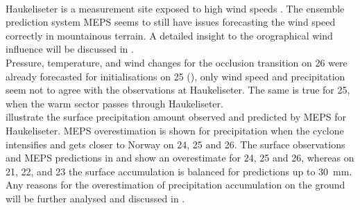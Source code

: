 \\
Haukeliseter is a measurement site exposed to high wind speeds \citep{wolff_measurements_2013,wolff_derivation_2015}. The ensemble prediction system MEPS seems to still have issues forecasting the wind speed correctly in mountainous terrain.
A detailed insight to the orographical wind influence will be discussed in . 
\\
Pressure, temperature, and wind changes for the occlusion transition on \SI{26}{\dec} were already forecasted for initialisations on \SI{25}{\dec} (), only wind speed and precipitation seem not to agree with the observations at Haukeliseter. The same is true for \SI{25}{\dec}, when the warm sector passes through Haukeliseter. 
\\
 illustrate the surface precipitation amount observed and predicted by MEPS for Haukeliseter. MEPS overestimation is shown for precipitation when the cyclone intensifies and gets closer to Norway on \num{24}, \num{25} and \SI{26}{\dec}. The surface observations and MEPS predictions in  and  show an overestimate for \num{24}, \num{25} and \SI{26}{\dec}, whereas on \num{21}, \num{22}, and \SI{23}{\dec} the surface accumulation is balanced for  predictions up to \SI{30}{\mm}. Any reasons for the overestimation of precipitation accumulation on the ground will be further analysed and discussed in . 
